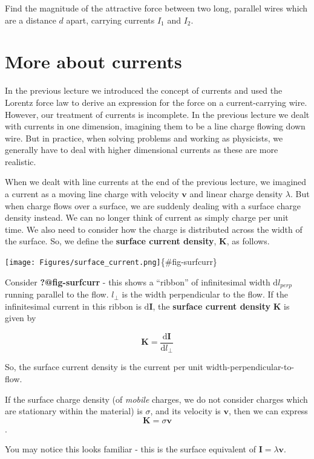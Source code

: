 \documentclass[
  letterpaper,
  DIV=11,
  numbers=noendperiod]{scrreprt}
\begin{document}
Find the magnitude of the attractive force between two long, parallel
wires which are a distance \(d\) apart, carrying currents \(I_1\) and
\(I_2\).

\section{More about currents}\label{sec-morecurrents}

In the previous lecture we introduced the concept of currents and used
the Lorentz force law to derive an expression for the force on a
current-carrying wire. However, our treatment of currents is incomplete.
In the previous lecture we dealt with currents in one dimension,
imagining them to be a line charge flowing down wire. But in practice,
when solving problems and working as physicists, we generally have to
deal with higher dimensional currents as these are more realistic.

When we dealt with line currents at the end of the previous lecture, we
imagined a current as a moving line charge with velocity
\(\mathrm{\mathbf{v}}\) and linear charge density \(\lambda\). But when
charge flows over a surface, we are suddenly dealing with a surface
charge density instead. We can no longer think of current as simply
charge per unit time. We also need to consider how the charge is
distributed across the width of the surface. So, we define the
\textbf{surface current density}, \(\mathrm{\mathbf{K}}\), as follows.

\texttt{[image: Figures/surface\_current.png]}\{\#fig-surfcurr\}

Consider \textbf{?@fig-surfcurr} - this shows a ``ribbon'' of
infinitesimal width \(\mathrm{d}l_{perp}\) running parallel to the flow.
\(l_{\perp}\) is the width perpendicular to the flow. If the
infinitesimal current in this ribbon is
\(\mathrm{d}\mathrm{\mathbf{I}}\), the \textbf{surface current density}
\(\mathrm{\mathbf{K}}\) is given by

\[ \mathrm{\mathbf{K}}= \frac{\mathrm{d}\mathrm{\mathbf{I}}}{\mathrm{d}l_{\perp}} \]

So, the surface current density is the current per unit
width-perpendicular-to-flow.

If the surface charge density (of \emph{mobile} charges, we do not
consider charges which are stationary within the material) is
\(\sigma\), and its velocity is \(\mathrm{\mathbf{v}}\), then we can
express \[ \mathrm{\mathbf{K}}= \sigma \mathrm{\mathbf{v}}\].

You may notice this looks familiar - this is the surface equivalent of
\(\mathrm{\mathbf{I}}= \lambda \mathrm{\mathbf{v}}\).
\end{document}
